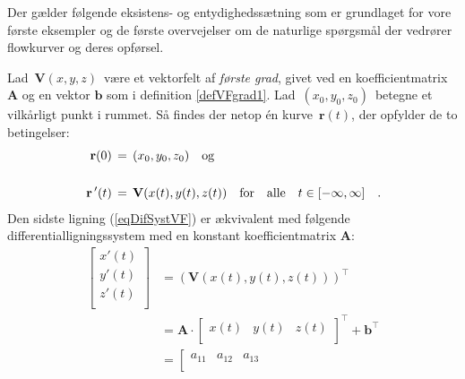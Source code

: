 Der gælder følgende eksistens- og entydighedssætning som er grundlaget for vore første eksempler og de første overvejelser om de naturlige spørgsmål der vedrører flowkurver og deres opførsel.

\begin{theorem} \label{thmVFgrad1}
Lad  $\,{\mathbf{V}}(x,y,z)\,$ være et vektorfelt af  \emph{første grad},  givet ved en koefficientmatrix $\mathbf{A}$ og en vektor $\mathbf{b}$ som i definition \ref{defVFgrad1}. Lad
 $\,(x_{0}, y_{0}, z_{0})\,$ betegne et vilkårligt punkt i rummet. Så
findes der netop \'{e}n kurve $\,{\mathbf{r}}(t)$,
der opfylder de to betingelser:
\begin{equation}\label{eqDifSystVF}
\begin{aligned}
\,{\mathbf{r}}(0) \, &= \, (x_{0}, y_{0}, z_{0}) \quad  {\rm{og}} \\ \\
\,{\mathbf{r}}\,'(t)\, &= \,{\mathbf{V}}(x(t), y(t), z(t)) \quad  {\rm{for}}\quad  {\rm{alle}} \quad
 t \in [-\infty, \infty] \quad .
\end{aligned}
\end{equation}
Den sidste ligning (\ref{eqDifSystVF})  er ækvivalent med følgende differentialligningssystem med en konstant koefficientmatrix $\mathbf{A}$:
\begin{equation}
\begin{aligned}
\left[
  \begin{array}{c}
    x'(t) \\
    y'(t) \\
    z'(t) \\
  \end{array}
\right] &= \left(\mathbf{V}(x(t), y(t), z(t))\right)^{\top}\\
 &= \mathbf{A}\cdot \left[
                                                                               \begin{array}{ccc}
                                                                                 x(t) & y(t) & z(t) \\
                                                                               \end{array}
                                                                             \right]^{\top} + \mathbf{b}^{\top} \\
&=
 \left[
                        \begin{array}{ccc}
                          a_{11} & a_{12} & a_{13} \\

\end{array}
\end{aligned}
\end{equation}
\end{theorem}
